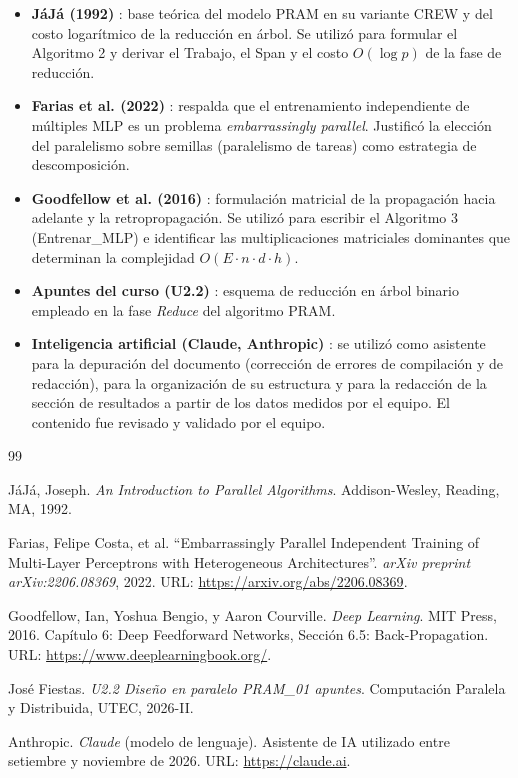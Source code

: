 \documentclass[11pt, a4paper]{article}
\begin{document}
\begin{itemize}
    \item \textbf{JáJá (1992)} \cite{jaja1992parallel}: base teórica del modelo PRAM en su variante CREW y del costo logarítmico de la reducción en árbol. Se utilizó para formular el Algoritmo 2 y derivar el Trabajo, el Span y el costo $O(\log p)$ de la fase de reducción.
    \item \textbf{Farias et al. (2022)} \cite{farias2022parallelmlps}: respalda que el entrenamiento independiente de múltiples MLP es un problema \textit{embarrassingly parallel}. Justificó la elección del paralelismo sobre semillas (paralelismo de tareas) como estrategia de descomposición.
    \item \textbf{Goodfellow et al. (2016)} \cite{goodfellow2016deep}: formulación matricial de la propagación hacia adelante y la retropropagación. Se utilizó para escribir el Algoritmo 3 (Entrenar\_MLP) e identificar las multiplicaciones matriciales dominantes que determinan la complejidad $O(E \cdot n \cdot d \cdot h)$.
    \item \textbf{Apuntes del curso (U2.2)} \cite{u2.2}: esquema de reducción en árbol binario empleado en la fase \textit{Reduce} del algoritmo PRAM.
    \item \textbf{Inteligencia artificial (Claude, Anthropic)} \cite{claude}: se utilizó como asistente para la depuración del documento (corrección de errores de compilación y de redacción), para la organización de su estructura y para la redacción de la sección de resultados a partir de los datos medidos por el equipo. El contenido fue revisado y validado por el equipo.
\end{itemize}

\begin{thebibliography}{99}

JáJá, Joseph.
\textit{An Introduction to Parallel Algorithms}.
Addison-Wesley, Reading, MA, 1992.

Farias, Felipe Costa, et al.
``Embarrassingly Parallel Independent Training of Multi-Layer Perceptrons with Heterogeneous Architectures''.
\textit{arXiv preprint arXiv:2206.08369}, 2022.
URL: \url{https://arxiv.org/abs/2206.08369}.

Goodfellow, Ian, Yoshua Bengio, y Aaron Courville.
\textit{Deep Learning}.
MIT Press, 2016. Capítulo 6: Deep Feedforward Networks, Sección 6.5: Back-Propagation.
URL: \url{https://www.deeplearningbook.org/}.

José Fiestas.
\textit{U2.2 Diseño en paralelo PRAM\_01 apuntes}.
Computación Paralela y Distribuida, UTEC, 2026-II.

Anthropic.
\textit{Claude} (modelo de lenguaje). Asistente de IA utilizado entre setiembre y noviembre de 2026.
URL: \url{https://claude.ai}.

\end{thebibliography}
\end{document}
